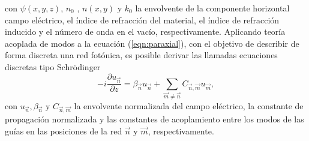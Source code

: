 con $\psi(x,y,z)$, $n_0$ , $n(x,y)$ y $k_0$ la envolvente de la componente horizontal campo eléctrico, el índice de refracción del material, el índice de refracción inducido y el número de onda en el vacío, respectivamente. Aplicando teoría acoplada de modos \cite{coupledmodetheory} a la ecuación (\ref{eqn:paraxial}), con el objetivo de describir de forma discreta una red fotónica, es posible derivar las llamadas ecuaciones discretas tipo Schrödinger \cite{discretesolitons, artificialFB, FBdynamics}
\begin{equation}
	-i\frac{\partial u_{\vec{n}} }{\partial z} = \beta_{\vec{n}}u_{\vec{n}} + \sum_{\vec{m}\neq\vec{n}} C_{\vec{n},\vec{m}}u_{\vec{m}}, \label{eqn:CMT}
\end{equation}
con $u_{\vec{n}}, \beta_{\vec{n}}$ y $C_{\vec{n}, \vec{m}}$ la envolvente normalizada del campo eléctrico, la constante de propagación normalizada y las constantes de acoplamiento entre los modos de las guías en las posiciones de la red $\vec{n}$ y $\vec{m}$, respectivamente.
\lipsum[50-60]